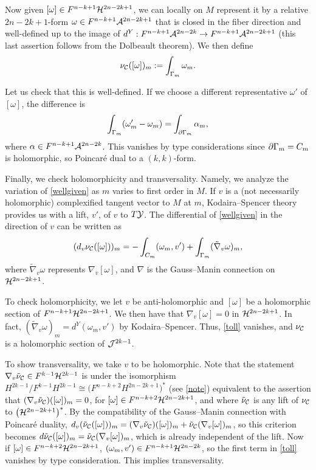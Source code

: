 Now given $[\omega]\in F^{n-k+1}{\cal H}^{2n-2k+1}$, we can locally on $M$ 
represent it by a relative ${2n-2k+1}$-form $\omega\in F^{n-k+1} {\cal A}^{2n-2k+1}$ 
that is closed in the fiber direction and well-defined up to the image
of $d^Y: F^{n-k+1} {\cal A}^{2n-2k}\to F^{n-k+1} {\cal A}^{2n-2k+1}$ (this last 
assertion follows from the Dolbeault theorem). We then define
\begin{equation}
\eqlabel{wellgiven}
\nu_\calc([\omega])_m := \int_{\Gamma_m} \omega_m .
\end{equation}

Let us check that this is well-defined. If we choose a different representative
$\omega'$ of $[\omega]$, the difference is
\begin{equation}
\eqlabel{final}
\int_{\Gamma_m}(\omega_m' - \omega_m) = \int_{\del\Gamma_m} \alpha_m ,
\end{equation}
where $\alpha\in F^{n-k+1}{\cal A}^{2n-2k}$. This vanishes by type considerations
since $\partial\Gamma_m=C_m$ is holomorphic, so Poincar\'e dual to a $(k,k)$-form.

Finally, we check holomorphicity and transversality. Namely, we analyze the
variation of \eqref{wellgiven} as $m$ varies to first order in $M$. 
If $v$ is a (not necessarily holomorphic) complexified tangent vector to 
$M$ at $m$, Kodaira--Spencer theory provides us with a lift, $v'$, of $v$ to 
$T{\cal Y}$. The differential of \eqref{wellgiven} in the direction of $v$ 
can be written as
\begin{equation} 
\eqlabel{toll}
(d_v\nu_\calc([\omega]))_m = - \int_{C_m} (\omega_m,v') + 
\int_{\Gamma_m}(\tilde\nabla_v\omega)_m ,
\end{equation}
where $\tilde\nabla_v\omega$ represents $\nabla_v[\omega]$, and $\nabla$ is 
the Gauss--Manin connection on ${\cal H}^{2n-2k+1}$.

To check holomorphicity, we let $v$ be anti-holomorphic and $[\omega]$ be a
holomorphic section of $F^{n-k+1}{\cal H}^{2n-2k+1}$. We then have that 
$\nabla_v[\omega]=0$ in ${\cal H}^{2n-2k+1}$. In fact, $(\tilde\nabla_v\omega)_m= 
d^Y (\omega_m,v')$ by Kodaira--Spencer. Thus, \eqref{toll} vanishes, and 
$\nu_{\cal C}$ is a holomorphic section of ${\cal J}^{2k-1}$.

To show transversality, we take $v$ to be holomorphic. Note that the statement 
$\nabla_v\tilde\nu_{\cal C}\in F^{k-1}{\cal H}^{2k-1}$ is under the isomorphism 
$H^{2k-1}/F^{k-1}H^{2k-1}\cong \bigl(F^{n-k+2} H^{2n-2k+1}\bigr)^*$
(see \eqref{note}) equivalent to the assertion that $(\nabla_v\tilde\nu_{\cal C})([\omega])_m 
= 0$, for $[\omega]\in F^{n-k+2} {\cal H}^{2n-2k+1}$, and where $\tilde\nu_{\cal C}$ is any 
lift of $\nu_{\cal C}$ to $\bigl({\cal H}^{2n-2k+1}\bigr)^*$. By the compatibility
of the Gauss--Manin connection with Poincar\'e duality,
$d_v(\tilde\nu_{\cal C}([\omega]))_m = (\nabla_v\tilde\nu_{\cal C})([\omega])_m +
\tilde\nu_{\cal C}(\nabla_v[\omega])_m$, so this criterion becomes 
$d\tilde\nu_{\cal C}([\omega])_m = \tilde\nu_{\cal C}(\nabla_v[\omega])_m $, which 
is already independent of the lift. Now if $[\omega]\in F^{n-k+2}{\cal H}^{2n-2k+1}$, 
$(\omega_m,v')\in F^{n-k+1}{\cal H}^{2n-2k}$, so the first term in \eqref{toll} vanishes 
by type consideration. This implies transversality.


